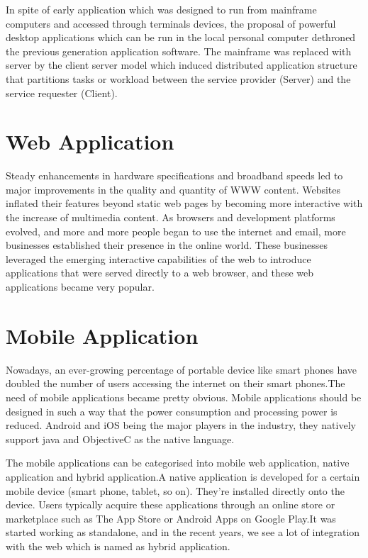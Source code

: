 			In spite of early application which was designed to run from mainframe computers and accessed through terminals devices, the proposal of powerful desktop applications which can be run in the local personal computer dethroned the previous generation application software. The mainframe was replaced with server by the client server model which induced distributed application structure that partitions tasks or workload between the service provider (Server) and the service requester (Client).  
			
\section{Web Application}
			
			Steady enhancements in hardware specifications and broadband speeds led to major improvements in the quality and quantity of WWW content. Websites inflated their features beyond static web pages by becoming more interactive with the increase of multimedia content. As browsers and development platforms evolved, and more and more people began to use the internet and email, more businesses established their presence in the online world. These businesses leveraged the emerging interactive capabilities of the web to introduce applications that were served directly to a web browser, and these web applications became very popular.

\section{Mobile Application}
			
			Nowadays, an ever-growing percentage of portable device like smart phones have doubled the number of users accessing the internet  on their smart phones.The need of mobile applications became pretty obvious. Mobile applications should be designed in such a way that the power consumption and processing power is reduced. Android and iOS being the major players in the industry, they natively support java and ObjectiveC as the native language. 
			
			The mobile applications can be categorised into mobile web application, native application and hybrid application.A native application is developed for a certain mobile device (smart phone, tablet, so on). They’re installed directly onto the device. Users typically acquire these applications through an online store or marketplace such as The App Store or Android Apps on Google Play.It was started working as standalone, and in the recent years, we see a lot of integration with the web which is named as hybrid application.
			
